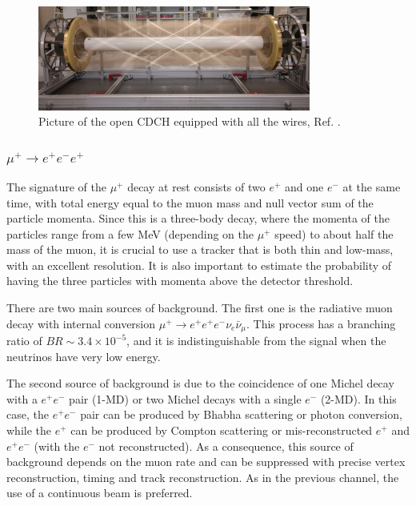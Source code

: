 \begin{figure}[!h]
\centering
\includegraphics[width =0.8\textwidth]{figures/png/Screenshot_20240307_140235.png}
\caption[MEG II detector (II).]{Picture of the open CDCH equipped with all the wires, Ref. \cite{megiicollaboration2024operation}.}
\label{fig:meg2}
\end{figure}






\subsubsection{$\mu^+ \rightarrow e^+ e^-  e^+ $}
The signature of the $\mu^+$ decay at rest consists of two $e^+$ and one $e^-$ at the same time, 
with total energy equal to the muon mass and null vector sum of the
particle momenta.
Since this is a three-body decay, where the momenta of the particles 
range from a few MeV (depending on the $\mu^+$ speed) to about half the mass of the muon, it is crucial 
to use a tracker that is both thin and low-mass, with an excellent resolution. 
It is also important to estimate the probability
of having the three particles with momenta above the detector threshold.

There are two main sources of background. The first one is the radiative muon decay with 
internal conversion $\mu^+ \rightarrow e^+ e^+ e^- \nu_e \bar{\nu}_\mu$. 
This process has a branching ratio of $BR\sim 3.4 \times 10^{-5}$, and it is 
indistinguishable from the signal when the neutrinos have very low energy. 

The second source of background is due to the coincidence 
of one Michel decay with a $e^+e^-$ pair (1-MD) or two Michel decays with a single $e^-$ (2-MD). 
In this case, the $e^+e^-$ pair can be produced by Bhabha scattering or photon conversion, while the $e^+$
can be produced by Compton scattering or mis-reconstructed $e^+$ and $e^+e^-$ (with the $e^-$ not reconstructed). 
As a consequence, this source of background depends on the muon rate and
can be suppressed with precise vertex reconstruction, timing and track reconstruction.
As in the previous channel, the use of a continuous beam is preferred.


